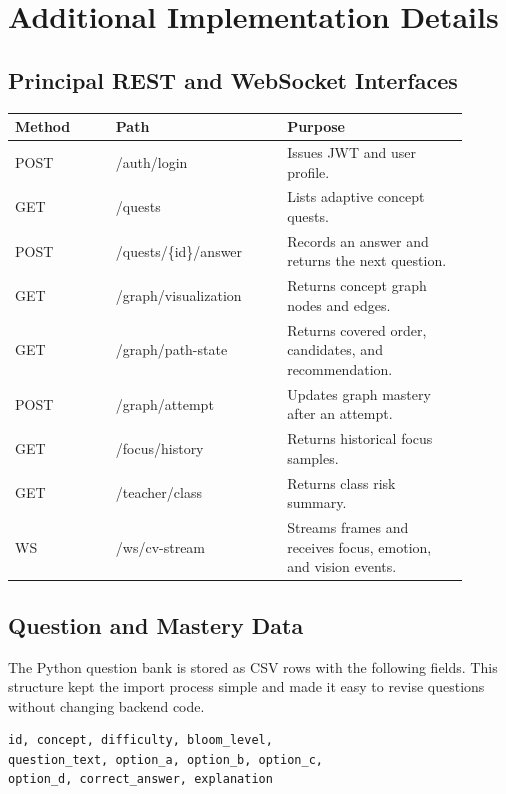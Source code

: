 \section{Additional Implementation Details}

\subsection{Principal REST and WebSocket Interfaces}

\begin{center}
\scriptsize
\renewcommand{\arraystretch}{1.08}
\begin{tabular}{p{0.2\linewidth}p{0.34\linewidth}p{0.36\linewidth}}
\toprule
\textbf{Method} & \textbf{Path} & \textbf{Purpose} \\
\midrule
POST & /auth/login & Issues JWT and user profile. \\
GET & /quests & Lists adaptive concept quests. \\
POST & /quests/\{id\}/answer & Records an answer and returns the next question. \\
GET & /graph/visualization & Returns concept graph nodes and edges. \\
GET & /graph/path-state & Returns covered order, candidates, and recommendation. \\
POST & /graph/attempt & Updates graph mastery after an attempt. \\
GET & /focus/history & Returns historical focus samples. \\
GET & /teacher/class & Returns class risk summary. \\
WS & /ws/cv-stream & Streams frames and receives focus, emotion, and vision events. \\
\bottomrule
\end{tabular}
\end{center}

\subsection{Question and Mastery Data}

The Python question bank is stored as CSV rows with the following fields. This structure kept the import process simple and made it easy to revise questions without changing backend code.

\begin{lstlisting}[style=codeblock]
id, concept, difficulty, bloom_level,
question_text, option_a, option_b, option_c,
option_d, correct_answer, explanation
\end{lstlisting}

